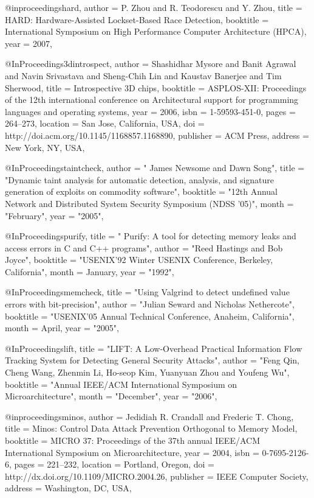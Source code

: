 @inproceedings{hard,
  author = {P. Zhou and R. Teodorescu and Y. Zhou},
  title = {{HARD: Hardware-Assisted Lockset-Based Race Detection}},
  booktitle = {International Symposium on High Performance Computer Architecture (HPCA)},
  year = 2007,
}
  

@InProceedings{3dintrospect,
 author = {Shashidhar Mysore and Banit Agrawal and Navin Srivastava and Sheng-Chih Lin and Kaustav Banerjee and Tim Sherwood},
 title = {{Introspective 3D chips}},
 booktitle = {ASPLOS-XII: Proceedings of the 12th international conference on Architectural support for programming languages and operating systems},
 year = {2006},
 isbn = {1-59593-451-0},
 pages = {264--273},
 location = {San Jose, California, USA},
 doi = {http://doi.acm.org/10.1145/1168857.1168890},
 publisher = {ACM Press},
 address = {New York, NY, USA},
}


@InProceedings{taintcheck,
  author =       "{ James Newsome and Dawn Song}",
  title =        "{Dynamic taint analysis for automatic detection, analysis, and signature generation of exploits on commodity software}",
  booktitle =    "{12th Annual Network and Distributed System Security Symposium (NDSS '05)}",
  month =        "February",
  year =         "2005",
}

@InProceedings{purify,
  title =       "{ Purify: A tool for detecting memory leaks and access errors in C and C++ programs}",
  author =        "{Reed Hastings and Bob Joyce}",
  booktitle =    "{USENIX'92 Winter USENIX Conference, Berkeley, California}",
  month =        January,
  year =         "1992",
}



@InProceedings{memcheck,
  title =       "{Using Valgrind to detect undefined value errors with bit-precision}",
  author =        "{Julian Seward and Nicholas Nethercote}",
  booktitle =    "{USENIX'05 Annual Technical Conference, Anaheim, California}",
  month =        April,
  year =         "2005",
}

@InProceedings{lift,
  title =       "{LIFT: A Low-Overhead Practical Information Flow Tracking System for Detecting General Security Attacks}",
  author =        "{Feng Qin, Cheng Wang, Zhenmin Li, Ho-seop Kim, Yuanyuan Zhou and Youfeng Wu}",
  booktitle =    "{Annual IEEE/ACM International Symposium on Microarchitecture}",
  month =        "December",
  year =         "2006",
}


@inproceedings{minos,
 author = {Jedidiah R. Crandall and Frederic T. Chong},
 title = {{Minos: Control Data Attack Prevention Orthogonal to Memory Model}},
 booktitle = {MICRO 37: Proceedings of the 37th annual IEEE/ACM International Symposium on Microarchitecture},
 year = {2004},
 isbn = {0-7695-2126-6},
 pages = {221--232},
 location = {Portland, Oregon},
 doi = {http://dx.doi.org/10.1109/MICRO.2004.26},
 publisher = {IEEE Computer Society},
 address = {Washington, DC, USA},
 }


